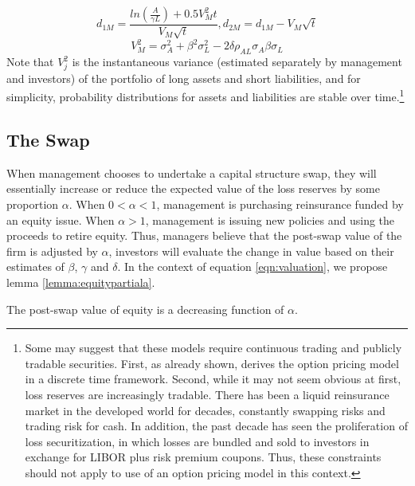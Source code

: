 \begin{displaymath}
d_{1M}=\frac{ln\left(\frac{A}{\gamma L}\right)+0.5V_M^2 t}{V_M\sqrt{t}}, d_{2M}=d_{1M}-V_M\sqrt{t}
\end{displaymath}
\begin{displaymath}
V_M^2=\sigma_A^2+\beta^2\sigma_L^2-2\delta\rho_{AL}\sigma_A\beta\sigma_L
\end{displaymath}
Note that $V_j^2$ is the instantaneous variance (estimated separately by management and investors) of the portfolio of long assets and short liabilities, and for simplicity, probability distributions for assets and liabilities are stable over time.\footnote{Some may suggest that these models require continuous trading and publicly tradable securities.  First, as already shown, \citet{rubinstein1976a} derives the option pricing model in a discrete time framework.  Second, while it may not seem obvious at first, loss reserves are increasingly tradable.  There has been a liquid reinsurance market in the developed world for decades, constantly swapping risks and trading risk for cash.  In addition, the past decade has seen the proliferation of loss securitization, in which losses are bundled and sold to investors in exchange for LIBOR plus risk premium coupons.  Thus, these constraints should not apply to use of an option pricing model in this context.}  

\subsection{The Swap}
When management chooses to undertake a capital structure swap, they will essentially increase or reduce the expected value of the loss reserves by some proportion $\alpha$.  When $0<\alpha<1$, management is purchasing reinsurance funded by an equity issue.  When $\alpha > 1$, management is issuing new policies and using the proceeds to retire equity.  Thus, managers believe that the post-swap value of the firm is adjusted by $\alpha$, investors will evaluate the change in value based on their estimates of $\beta$, $\gamma$ and $\delta$. In the context of equation \ref{eqn:valuation}, we propose lemma \ref{lemma:equitypartiala}.

\begin{lemma}\label{lemma:equitypartiala}
The post-swap value of equity is a decreasing function of $\alpha$.
\end{lemma}

